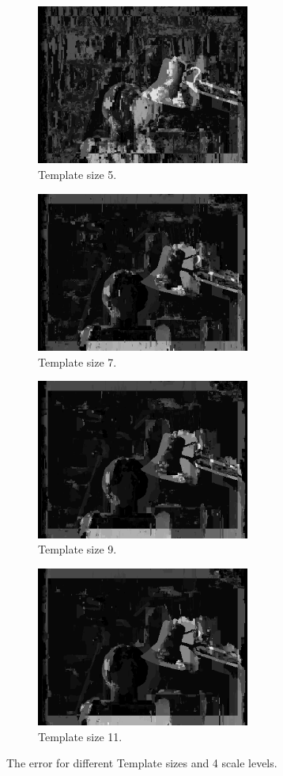 \documentclass[12pt,a4paper,oneside,final]{article}
\begin{document}
\begin{figure}[H]
	\centering
	\begin{subfigure}[b]{0.5\textwidth}
		\centering
		\includegraphics[width=7cm]{err_s4_k5set_1.png}
		\caption{Template size 5.}
	\end{subfigure}%
	\begin{subfigure}[b]{0.5\textwidth}
		\centering
		\includegraphics[width=7cm]{err_s4_k7set_1.png}
		\caption{Template size 7.}
	\end{subfigure}
	\begin{subfigure}[b]{0.5\textwidth}
		\centering
		\includegraphics[width=7cm]{err_s4_k9set_1.png}
		\caption{Template size 9.}
	\end{subfigure}%
	\begin{subfigure}[b]{0.5\textwidth}
		\centering
		\includegraphics[width=7cm]{err_s4_k11set_1.png}
		\caption{Template size 11.}
	\end{subfigure}
	\caption{The error for different Template sizes and 4 scale levels.}
	\label{fig:error}
\end{figure}
\end{document}
